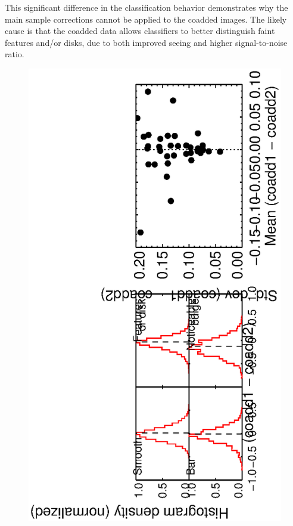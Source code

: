 \documentclass[useAMS,usenatbib]{mn2e}
\begin{document}
This significant difference in the classification behavior demonstrates why the main sample corrections cannot be applied to the coadded images. The likely cause is that the coadded data allows classifiers to better distinguish faint features and/or disks, due to both improved seeing \citep[from $1.4\arcsec$ to $1.1\arcsec$;][]{ann11} and higher signal-to-noise ratio.

\begin{figure}
\includegraphics[angle=-90,width=7.0in]{figures/stripe82_coadd_compare.ps}

\end{figure}
\end{document}
